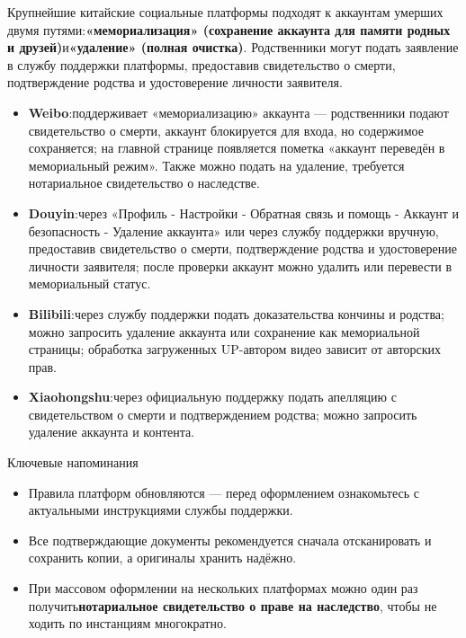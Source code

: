 
Крупнейшие китайские социальные платформы подходят к аккаунтам умерших двумя путями:\textbf{«мемориализация» (сохранение аккаунта для памяти родных и друзей)}и\textbf{«удаление» (полная очистка)}. Родственники могут подать заявление в службу поддержки платформы, предоставив свидетельство о смерти, подтверждение родства и удостоверение личности заявителя.

\begin{itemize}
  \item \textbf{Weibo}:поддерживает «мемориализацию» аккаунта — родственники подают свидетельство о смерти, аккаунт блокируется для входа, но содержимое сохраняется; на главной странице появляется пометка «аккаунт переведён в мемориальный режим». Также можно подать на удаление, требуется нотариальное свидетельство о наследстве.
  \item \textbf{Douyin}:через «Профиль - Настройки - Обратная связь и помощь - Аккаунт и безопасность - Удаление аккаунта» или через службу поддержки вручную, предоставив свидетельство о смерти, подтверждение родства и удостоверение личности заявителя; после проверки аккаунт можно удалить или перевести в мемориальный статус.
  \item \textbf{Bilibili}:через службу поддержки подать доказательства кончины и родства; можно запросить удаление аккаунта или сохранение как мемориальной страницы; обработка загруженных UP-автором видео зависит от авторских прав.
  \item \textbf{Xiaohongshu}:через официальную поддержку подать апелляцию с свидетельством о смерти и подтверждением родства; можно запросить удаление аккаунта и контента.
\end{itemize}

\begin{tcbinfo}{Ключевые напоминания}
\begin{itemize}
  \item Правила платформ обновляются — перед оформлением ознакомьтесь с актуальными инструкциями службы поддержки.
  \item Все подтверждающие документы рекомендуется сначала отсканировать и сохранить копии, а оригиналы хранить надёжно.
  \item При массовом оформлении на нескольких платформах можно один раз получить\textbf{нотариальное свидетельство о праве на наследство}, чтобы не ходить по инстанциям многократно.
\end{itemize}

\end{tcbinfo}


